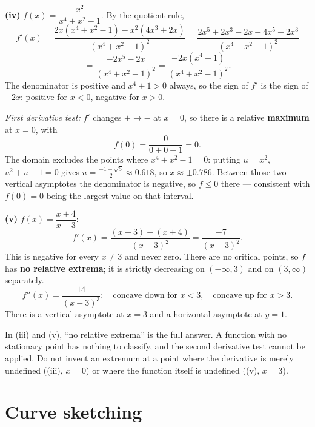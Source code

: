 \begin{solution}
\medskip
\textbf{(iv)} $f(x)=\dfrac{x^{2}}{x^{4}+x^{2}-1}$. By the quotient rule,
\[
f'(x)=\frac{2x(x^{4}+x^{2}-1)-x^{2}(4x^{3}+2x)}{(x^{4}+x^{2}-1)^{2}}
=\frac{2x^{5}+2x^{3}-2x-4x^{5}-2x^{3}}{(x^{4}+x^{2}-1)^{2}}
\]
\[
=\frac{-2x^{5}-2x}{(x^{4}+x^{2}-1)^{2}}
=\frac{-2x\left(x^{4}+1\right)}{(x^{4}+x^{2}-1)^{2}} .
\]
The denominator is positive and $x^{4}+1>0$ always, so the sign of $f'$ is the
sign of $-2x$: positive for $x<0$, negative for $x>0$.

\emph{First derivative test:} $f'$ changes $+\to-$ at $x=0$, so there is a
relative \textbf{maximum} at $x=0$, with
\[
f(0)=\frac{0}{0+0-1}=0 .
\]
The domain excludes the points where $x^{4}+x^{2}-1=0$: putting $u=x^{2}$,
$u^{2}+u-1=0$ gives $u=\tfrac{-1+\sqrt5}{2}\approx0.618$, so
$x\approx\pm0.786$. Between those two vertical asymptotes the denominator is
negative, so $f\le0$ there --- consistent with $f(0)=0$ being the largest value
on that interval.

\medskip
\textbf{(v)} $f(x)=\dfrac{x+4}{x-3}$:
\[
f'(x)=\frac{(x-3)-(x+4)}{(x-3)^{2}}=\frac{-7}{(x-3)^{2}} .
\]
This is negative for every $x\neq3$ and never zero. There are no critical
points, so $f$ has \textbf{no relative extrema}; it is strictly decreasing on
$(-\infty,3)$ and on $(3,\infty)$ separately.
\[
f''(x)=\frac{14}{(x-3)^{3}}:\quad
\text{concave down for }x<3,\quad\text{concave up for }x>3 .
\]
There is a vertical asymptote at $x=3$ and a horizontal asymptote at $y=1$.

\end{solution}

\begin{pitfall}
In (iii) and (v), ``no relative extrema'' is the full answer. A function with
no stationary point has nothing to classify, and the second derivative test
cannot be applied. Do not invent an extremum at a point where the derivative is
merely undefined ((iii), $x=0$) or where the function itself is undefined
((v), $x=3$).
\end{pitfall}

\section{Curve sketching}

